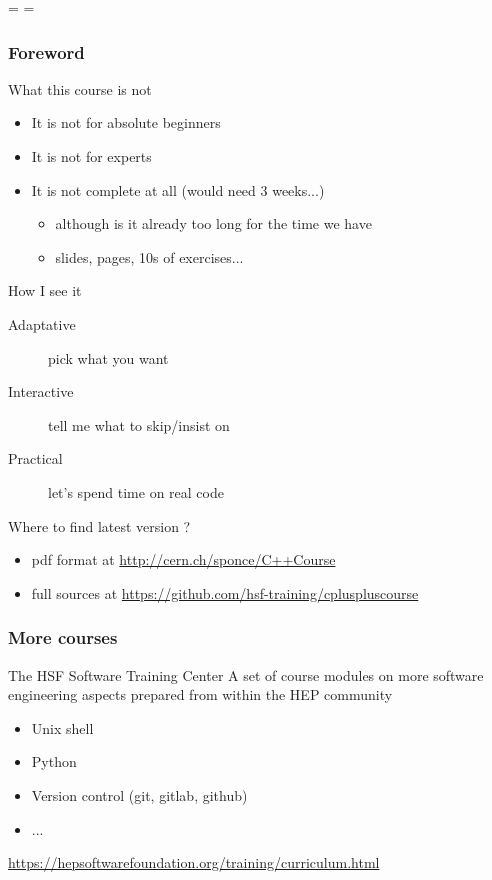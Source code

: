 \documentclass[compress]{beamer}
\begin{document}
\showboxdepth=\maxdimen
\showboxbreadth=\maxdimen

\begin{frame}
  \titlepage
\end{frame}

\begin{frame}
  \frametitle{Foreword}
  \begin{block}{What this course is not}
    \begin{itemize}
    \item It is not for absolute beginners
    \item It is not for experts
    \item It is not complete at all (would need 3 weeks...)
      \begin{itemize}
      \item although is it already too long for the time we have
      \item \inserttotalframenumber{} slides, \insertpresentationendpage{} pages, 10s of exercises...
      \end{itemize}
    \end{itemize}
  \end{block}
  \begin{block}{How I see it}
    \begin{description}
    \item[Adaptative] pick what you want
    \item[Interactive] tell me what to skip/insist on
    \item[Practical] let's spend time on real code
    \end{description}
  \end{block}
  \begin{block}{Where to find latest version ?}
    \begin{itemize}
    \item pdf format at {\small \url{http://cern.ch/sponce/C++Course}}
    \item full sources at {\scriptsize \url{https://github.com/hsf-training/cpluspluscourse}}
    \end{itemize}
  \end{block}
\end{frame}


\begin{frame}
  \frametitle{More courses}
  \begin{block}{The HSF Software Training Center}
    A set of course modules on more software engineering aspects prepared from within the HEP community
    \begin{itemize}
      \item Unix shell
      \item Python
      \item Version control (git, gitlab, github)
      \item ...
    \end{itemize}
    {\small \url{https://hepsoftwarefoundation.org/training/curriculum.html}}
  \end{block}

\end{frame}
\end{document}
